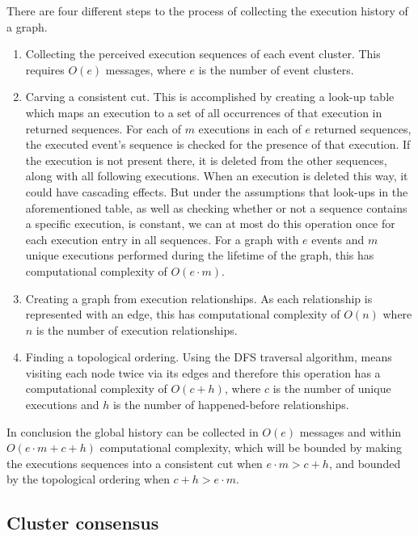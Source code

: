 \documentclass{article}
\begin{document}
	There are four different steps to the process of collecting the execution history of a graph.
	\begin{enumerate}
		\item Collecting the perceived execution sequences of each event cluster.
		This requires $O(e)$ messages, where $e$ is the number of event clusters.
		\item Carving a consistent cut.
		This is accomplished by creating a look-up table which maps an execution to a set of all occurrences of that execution in returned sequences.
		For each of $m$ executions in each of $e$ returned sequences, the executed event's sequence is checked for the presence of that execution.
		If the execution is not present there, it is deleted from the other sequences, along with all following executions.
		When an execution is deleted this way, it could have cascading effects.
		But under the assumptions that look-ups in the aforementioned table, as well as checking whether or not a sequence contains a specific execution, is constant, we can at most do this operation once for each execution entry in all sequences.
		For a graph with $e$ events and $m$ unique executions performed during the lifetime of the graph, this has computational complexity of $O(e\cdot m)$.
		\item Creating a graph from execution relationships. As each relationship is represented with an edge, this has computational complexity of $O(n)$ where $n$ is the number of execution relationships.
		\item Finding a topological ordering.
		Using the DFS traversal algorithm, means visiting each node twice via its edges and therefore this operation has a computational complexity of $O(c + h)$, where $c$ is the number of unique executions and $h$ is the number of happened-before relationships.
	\end{enumerate}

	In conclusion the global history can be collected in $O(e)$ messages and within $O(e \cdot m + c + h)$ computational complexity, which will be bounded by making the executions sequences into a consistent cut when $e \cdot m > c + h$, and bounded by the topological ordering when $c+h > e \cdot m$.

	\subsection{Cluster consensus}
	\label{subsec:cluster-consensus}
\end{document}
